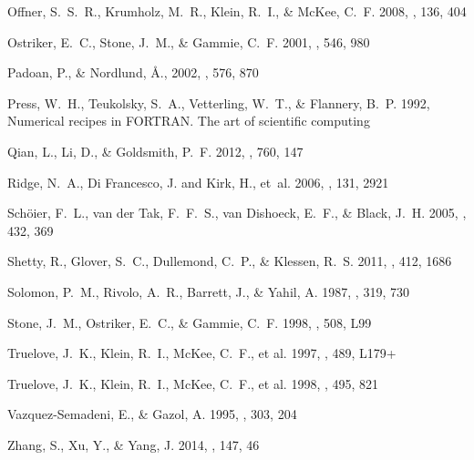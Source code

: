 \documentclass[iop,revtex4]{emulateapj}
\begin{document}
\begin{thebibliography}{40}
{Offner}, S.~S.~R., {Krumholz}, M.~R., {Klein}, R.~I., \& {McKee}, C.~F. 2008,
  \aj, 136, 404

{Ostriker}, E.~C., {Stone}, J.~M., \& {Gammie}, C.~F. 2001, \apj, 546, 980

{Padoan}, P., \& {Nordlund}, \AA., 2002,
  \apj, 576, 870

{Press}, W.~H., {Teukolsky}, S.~A., {Vetterling}, W.~T., \& {Flannery}, B.~P.
  1992, {Numerical recipes in FORTRAN. The art of scientific computing}

{Qian}, L., {Li}, D., \& {Goldsmith}, P.~F. 2012, \apj, 760, 147

{Ridge}, N.~A., {Di Francesco}, J. and {Kirk}, H., {et~al.} 2006, \aj, 131, 2921

{Sch{\"o}ier}, F.~L., {van der Tak}, F.~F.~S., {van Dishoeck}, E.~F., \&
  {Black}, J.~H. 2005, \aap, 432, 369

{Shetty}, R., {Glover}, S.~C., {Dullemond}, C.~P., \& {Klessen}, R.~S. 2011,
  \mnras, 412, 1686

{Solomon}, P.~M., {Rivolo}, A.~R., {Barrett}, J., \& {Yahil}, A. 1987, \apj,
  319, 730

{Stone}, J.~M., {Ostriker}, E.~C., \& {Gammie}, C.~F. 1998, \apjl, 508, L99

{Truelove}, J.~K., {Klein}, R.~I., {McKee}, C.~F., et al. 1997, \apjl, 489, L179+

{Truelove}, J.~K., {Klein}, R.~I., {McKee}, C.~F., et al. 1998, \apj, 495, 821

{Vazquez-Semadeni}, E., \& {Gazol}, A. 1995, \aap, 303, 204

{Zhang}, S., {Xu}, Y., \& {Yang}, J. 2014, \aj, 147, 46

\end{thebibliography}
\end{document}
